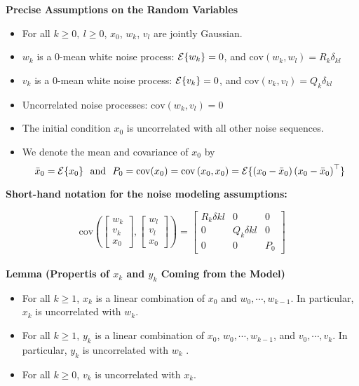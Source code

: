 \documentclass[letterpaper]{article}
\newcommand{\cov}{\mathrm{cov}}
\newcommand{\Expectof}[1]{{\cal E} \{ #1 \}}
\newcommand{\Covof}[2]{ \mathrm{cov} \left(#1,#2\right)}
\begin{document}
\noindent \textbf{Precise Assumptions on the Random Variables}~
\begin{itemize}
\setlength{\itemsep}{.5cm}
\item  For all $k\ge 0,~l\ge 0$, $x_0$, $w_k$, $v_l$ are jointly Gaussian.

\item $w_k$ is a 0-mean white noise process: $\Expectof{w_k}=0$, and $\Covof{w_k}{w_l}= R_k \delta_{kl}$

\item $v_k$ is a 0-mean white noise process: $\Expectof{v_k}=0$, and $\Covof{v_k}{v_l}= Q_k \delta_{kl}$

\item Uncorrelated noise processes: $\Covof{w_k}{v_l} = 0$

\item The initial condition $x_0$ is uncorrelated with all other noise sequences.

\item We denote the mean and covariance of $x_0$ by
$$\bar{x}_0 = \Expectof{x_0}~~\mbox{and}~~ P_0 = \cov(x_0)=\Covof{x_0}{x_0}= \Expectof{ \left(x_0-\bar{x}_0\right) \left(x_0-\bar{x}_0\right)^\top }$$

\end{itemize}

\newpage

\textbf{Short-hand notation for the noise modeling assumptions:}

$$\Covof{ \left[ \begin{array}{c} w_k\\ v_k \\ x_0 \end{array}  \right]} { \left[ \begin{array}{c} w_l\\ v_l \\ x_0 \end{array}  \right] } =
 \left[ \begin{array}{ccc} R_k \delta{kl} & 0 &0 \\ 0 & Q_k \delta{kl} & 0\\ 0 & 0& P_0 \end{array}  \right]$$\\



 \textbf{Lemma (Propertis of $x_k$ and $y_k$ Coming from the Model)}
 \begin{itemize}
\setlength{\itemsep}{.5cm}
\item  For all $k\ge 1$, $x_k$ is a linear combination of $x_0$ and $w_0, \cdots, w_{k-1}$. In particular, $x_k$ is uncorrelated with $w_k$.

\item  For all $k\ge 1$, $y_k$ is a linear combination of $x_0$, $w_0, \cdots, w_{k-1}$, and $v_0, \cdots, v_k$. In particular, $y_k$ is uncorrelated with $w_k$ .

    \item For all $k\ge 0$, $v_k$ is uncorrelated with $x_k$.

\end{itemize}
\end{document}
